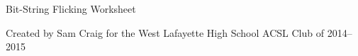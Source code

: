 \documentclass[12pt,letterpaper]{article}
\begin{document}
\begin{center}
  Bit-String Flicking Worksheet

  Created by Sam Craig for the West Lafayette High School ACSL Club of 2014--2015
\end{center}
\end{document}
